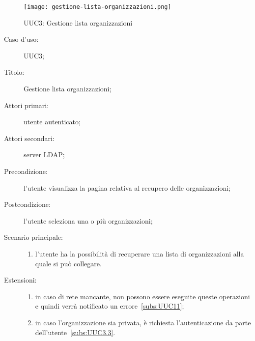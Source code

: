 \documentclass[../../../analisi-dei-requisiti.tex]{subfiles}
\begin{document}
\begin{figure}[H]
  \centering
  \texttt{[image: gestione-lista-organizzazioni.png]}
  \caption{UUC3: Gestione lista organizzazioni}%
  \label{fig:UUC3}
\end{figure}

\begin{description}
  \item[Caso d’uso:] UUC3;
  \item[Titolo:] Gestione lista organizzazioni;
  \item[Attori primari:] utente autenticato;
  \item[Attori secondari:] server LDAP\@;
  \item[Precondizione:] l'utente visualizza la pagina relativa al recupero delle organizzazioni;
  \item[Postcondizione:] l'utente seleziona una o più organizzazioni;
  \item[Scenario principale:]
        \begin{enumerate}
          \item l'utente ha la possibilità di recuperare una lista di organizzazioni alla quale si può collegare.
        \end{enumerate}
  \item[Estensioni:]
        \begin{enumerate}
          \item in caso di rete mancante, non possono essere eseguite queste operazioni e quindi verrà notificato un errore~\ref{subs:UUC11};
          \item in caso l'organizzazione sia privata, è richiesta l'autenticazione da parte dell'utente~\ref{subs:UUC3.3}.
        \end{enumerate}
\end{description}
\end{document}
